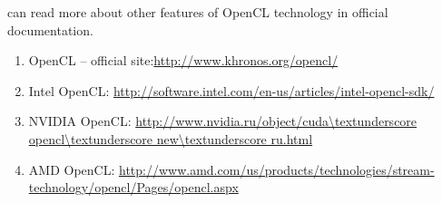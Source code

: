 {\begin{figure}[H]
		\label{OpenCLKernelExample:image}
	\end{figure}
	\sloppyYou can read more about other features of OpenCL technology %
	in official documentation.
	\begin{enumerate}
		\sloppy
		\item OpenCL – official site:\url{http://www.khronos.org/opencl/}
		\item Intel OpenCL: \url{http://software.intel.com/en-us/articles/intel-opencl-sdk/}
		\item NVIDIA OpenCL: \url{http://www.nvidia.ru/object/cuda\textunderscore opencl\textunderscore new\textunderscore ru.html}
		\item AMD OpenCL: \url{http://www.amd.com/us/products/technologies/stream-technology/opencl/Pages/opencl.aspx}
	\end{enumerate}
}